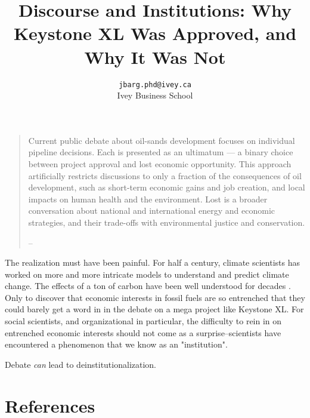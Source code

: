 \documentclass{article}
\title{Discourse and Institutions: Why Keystone XL Was Approved, and Why It Was Not}
\author{
	\texttt{jbarg.phd@ivey.ca}\\
	Ivey Business School
}
\begin{document}
	\maketitle
	\clearpage

	\begin{quote}
		Current public debate about oil-sands development focuses on individual pipeline decisions. Each is presented as an ultimatum — a binary choice between project approval and lost economic opportunity. This approach artificially restricts discussions to only a fraction of the consequences of oil development, such as short-term economic gains and job creation, and local impacts on human health and the environment. Lost is a broader conversation about national and international energy and economic strategies, and their trade-offs with environmental justice and conservation.

		-- \citet[p. 466]{Palen2014}
	\end{quote}

	The realization must have been painful. For half a century, climate scientists has worked on more and more intricate models to understand and predict climate change. The effects of a ton of carbon have been well understood for decades \citep{Forster2017}. Only to discover that economic interests in fossil fuels are so entrenched that they could barely get a word in in the debate on a mega project like Keystone XL. For social scientists, and organizational in particular, the difficulty to rein in on entrenched economic interests should not come as a surprise--scientists have encountered a phenomenon that we know as an "institution".

	

	Debate \textit{can} lead to deinstitutionalization. 





	\clearpage
	\section*{References}
	\printbibliography[heading=none]
\end{document}
